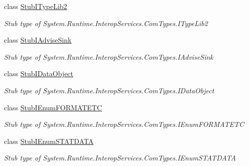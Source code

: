 \begin{DoxyCompactItemize}
class \hyperlink{class_system_1_1_runtime_1_1_interop_services_1_1_com_types_1_1_fakes_1_1_stub_i_type_lib2}{Stub\-I\-Type\-Lib2}
\begin{DoxyCompactList}\small\item\em Stub type of System.\-Runtime.\-Interop\-Services.\-Com\-Types.\-I\-Type\-Lib2\end{DoxyCompactList}\item 
class \hyperlink{class_system_1_1_runtime_1_1_interop_services_1_1_com_types_1_1_fakes_1_1_stub_i_advise_sink}{Stub\-I\-Advise\-Sink}
\begin{DoxyCompactList}\small\item\em Stub type of System.\-Runtime.\-Interop\-Services.\-Com\-Types.\-I\-Advise\-Sink\end{DoxyCompactList}\item 
class \hyperlink{class_system_1_1_runtime_1_1_interop_services_1_1_com_types_1_1_fakes_1_1_stub_i_data_object}{Stub\-I\-Data\-Object}
\begin{DoxyCompactList}\small\item\em Stub type of System.\-Runtime.\-Interop\-Services.\-Com\-Types.\-I\-Data\-Object\end{DoxyCompactList}\item 
class \hyperlink{class_system_1_1_runtime_1_1_interop_services_1_1_com_types_1_1_fakes_1_1_stub_i_enum_f_o_r_m_a_t_e_t_c}{Stub\-I\-Enum\-F\-O\-R\-M\-A\-T\-E\-T\-C}
\begin{DoxyCompactList}\small\item\em Stub type of System.\-Runtime.\-Interop\-Services.\-Com\-Types.\-I\-Enum\-F\-O\-R\-M\-A\-T\-E\-T\-C\end{DoxyCompactList}\item 
class \hyperlink{class_system_1_1_runtime_1_1_interop_services_1_1_com_types_1_1_fakes_1_1_stub_i_enum_s_t_a_t_d_a_t_a}{Stub\-I\-Enum\-S\-T\-A\-T\-D\-A\-T\-A}
\begin{DoxyCompactList}\small\item\em Stub type of System.\-Runtime.\-Interop\-Services.\-Com\-Types.\-I\-Enum\-S\-T\-A\-T\-D\-A\-T\-A\end{DoxyCompactList}\end{DoxyCompactItemize}
